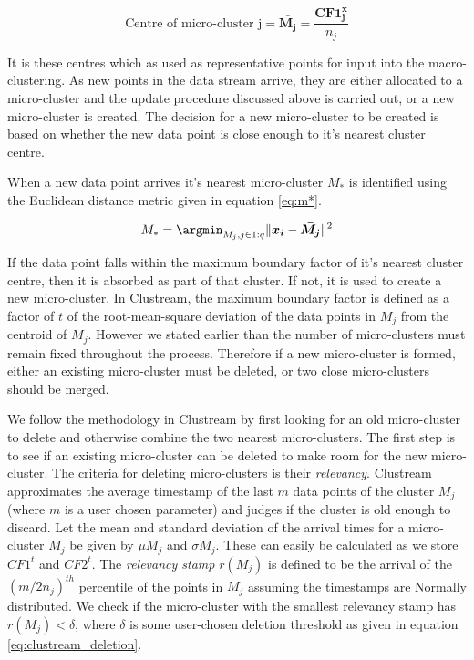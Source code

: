 \begin{equation}
  \label{eq:micro_centre}
  \text{Centre of micro-cluster j}  = \boldsymbol{\bar{M_j}} = \frac{\boldsymbol{CF1^x_j}}{n_j}
\end{equation}

It is these centres which as used as representative points for input into the macro-clustering.  As new points in the data stream arrive, they are either allocated to a micro-cluster and the update procedure discussed above is carried out, or a new micro-cluster is created. The decision for a new micro-cluster to be created is based on whether the new data point is close enough to it's nearest cluster centre. 

When a new data point arrives it's nearest micro-cluster $M_{*}$ is identified using the Euclidean distance metric given in equation \eqref{eq:m*}.

\begin{equation}
  \label{eq:m*}
 M_{*} = \argmin_{M_j , j \in 1:q} \lVert {\boldsymbol{x_i} -\boldsymbol{\bar{M_j}} } \rVert ^2
\end{equation}

 If the data point falls within the maximum boundary factor of it's nearest cluster centre, then it is absorbed as part of that cluster. If not, it is used to create a new micro-cluster. In Clustream, the maximum boundary factor is defined as a factor of $t$ of the root-mean-square deviation of the data points in $M_j$ from the centroid of $M_j$. However we stated earlier than the number of micro-clusters must remain fixed throughout the process. Therefore if a new micro-cluster is formed, either an existing micro-cluster must be deleted, or two close micro-clusters should be merged.  %

 We follow the methodology in Clustream by first looking for an old micro-cluster to delete and otherwise combine the two nearest micro-clusters. The first step is to see if an existing micro-cluster can be deleted to make room for the new micro-cluster. The criteria for deleting micro-clusters is their \textit{relevancy}. Clustream approximates the average timestamp of the last $m$ data points of the cluster $M_j$ (where $m$ is a user chosen parameter) and judges if the cluster is old enough to discard.  Let the mean and standard deviation of the arrival times for a micro-cluster $M_j$ be given by $\mu M_j$ and $\sigma M_j$. These can easily be calculated as we store $CF1^t$ and $CF2^t$. The \textit{relevancy stamp} $r(M_j)$ is defined to be the arrival of the $(m/2n_j)^{th}$ percentile of the points in $M_j$ assuming the timestamps are Normally distributed. We check if the micro-cluster with the smallest relevancy stamp has $r(M_j) < \delta$, where $\delta$ is some user-chosen deletion threshold as given in equation \eqref{eq:clustream_deletion}.

